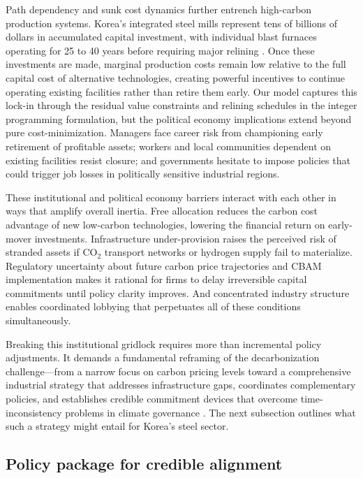 \documentclass[preprint,1p,authoryear]{elsarticle}
\begin{document}
Path dependency and sunk cost dynamics further entrench high-carbon production systems. Korea's integrated steel mills represent tens of billions of dollars in accumulated capital investment, with individual blast furnaces operating for 25 to 40 years before requiring major relining \citep{MaterialEconomics2019}. Once these investments are made, marginal production costs remain low relative to the full capital cost of alternative technologies, creating powerful incentives to continue operating existing facilities rather than retire them early. Our model captures this lock-in through the residual value constraints and relining schedules in the integer programming formulation, but the political economy implications extend beyond pure cost-minimization. Managers face career risk from championing early retirement of profitable assets; workers and local communities dependent on existing facilities resist closure; and governments hesitate to impose policies that could trigger job losses in politically sensitive industrial regions.

These institutional and political economy barriers interact with each other in ways that amplify overall inertia. Free allocation reduces the carbon cost advantage of new low-carbon technologies, lowering the financial return on early-mover investments. Infrastructure under-provision raises the perceived risk of stranded assets if CO$_2$ transport networks or hydrogen supply fail to materialize. Regulatory uncertainty about future carbon price trajectories and CBAM implementation makes it rational for firms to delay irreversible capital commitments until policy clarity improves. And concentrated industry structure enables coordinated lobbying that perpetuates all of these conditions simultaneously.

Breaking this institutional gridlock requires more than incremental policy adjustments. It demands a fundamental reframing of the decarbonization challenge—from a narrow focus on carbon pricing levels toward a comprehensive industrial strategy that addresses infrastructure gaps, coordinates complementary policies, and establishes credible commitment devices that overcome time-inconsistency problems in climate governance \citep{Green2021}. The next subsection outlines what such a strategy might entail for Korea's steel sector.

\subsection{Policy package for credible alignment}
\end{document}
